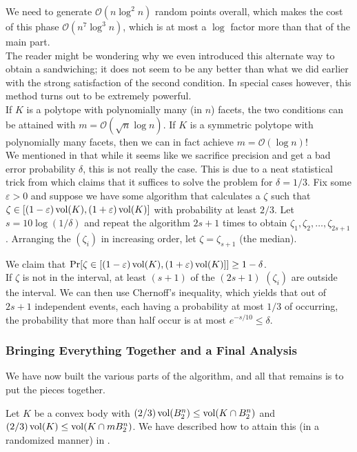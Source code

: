 We need to generate $\mathcal{O}(n\log^2 n)$ random points overall, which makes the cost of this phase $\mathcal{O}(n^7\log^3 n)$, which is at most a $\log$ factor more than that of the main part.\\

The reader might be wondering why we even introduced this alternate way to obtain a sandwiching; it does not seem to be any better than what we did earlier with the strong satisfaction of the second condition. In special cases however, this method turns out to be extremely powerful.\\
If $K$ is a polytope with polynomially many (in $n$) facets, the two conditions can be attained with $m=\mathcal{O}(\sqrt{n}\log n)$. If $K$ is a symmetric polytope with polynomially many facets, then we can in fact achieve $m=\mathcal{O}(\log n)$!\\

We mentioned in  that while it seems like we sacrifice precision and get a bad error probability $\delta$, this is not really the case. This is due to a neat statistical trick from \cite{JerrumValiantVazirani1986} which claims that it suffices to solve the problem for $\delta=1/3$. Fix some $\varepsilon>0$ and suppose we have some algorithm that calculates a $\zeta$ such that $\zeta\in[(1-\varepsilon)\operatorname{vol}(K),(1+\varepsilon)\operatorname{vol}(K)]$ with probability at least $2/3$. Let $s=10\log(1/\delta)$ and repeat the algorithm $2s+1$ times to obtain $\zeta_1,\zeta_2,\ldots,\zeta_{2s+1}$. Arranging the $(\zeta_i)$ in increasing order, let $\zeta=\zeta_{s+1}$ (the median).

We claim that $\Pr[\zeta\in[(1-\varepsilon)\operatorname{vol}(K),(1+\varepsilon)\operatorname{vol}(K)]] \geq 1-\delta$.\\
If $\zeta$ is not in the interval, at least $(s+1)$ of the $(2s+1)$ $(\zeta_i)$ are outside the interval. We can then use Chernoff's inequality, which yields that out of $2s+1$ independent events, each having a probability at most $1/3$ of occurring, the probability that more than half occur is at most $e^{-s/10}\leq\delta$.

\subsubsection{Bringing Everything Together and a Final Analysis}

We have now built the various parts of the algorithm, and all that remains is to put the pieces together.

Let $K$ be a convex body with $(2/3)\operatorname{vol}(B_2^n) \leq \operatorname{vol}(K\cap B_2^n)$ and $(2/3)\operatorname{vol}(K) \leq \operatorname{vol}(K\cap mB_2^n)$. We have described how to attain this (in a randomized manner) in .\\

